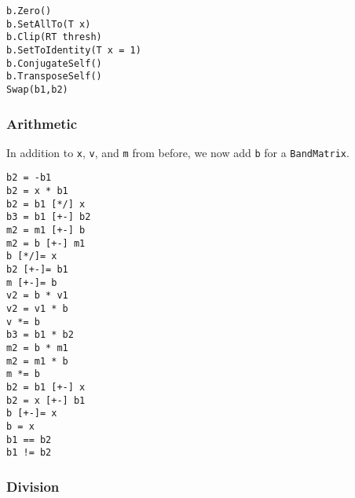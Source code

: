 \documentclass[twoside,letterpaper,11pt]{article}
\renewcommand{\tt}[1]{{\texttt {#1}}}
\begin{document}
\begin{verbatim}
b.Zero()
b.SetAllTo(T x)
b.Clip(RT thresh)
b.SetToIdentity(T x = 1)
b.ConjugateSelf()
b.TransposeSelf()
Swap(b1,b2)
\end{verbatim}

\subsubsection{Arithmetic}

In addition to \tt{x}, \tt{v}, and \tt{m} from before, we now add \tt{b} 
for a \tt{BandMatrix}.

\begin{verbatim}
b2 = -b1
b2 = x * b1
b2 = b1 [*/] x
b3 = b1 [+-] b2
m2 = m1 [+-] b
m2 = b [+-] m1
b [*/]= x
b2 [+-]= b1
m [+-]= b
v2 = b * v1
v2 = v1 * b
v *= b
b3 = b1 * b2
m2 = b * m1
m2 = m1 * b
m *= b
b2 = b1 [+-] x
b2 = x [+-] b1
b [+-]= x
b = x
b1 == b2
b1 != b2
\end{verbatim}

\subsubsection{Division}
\end{document}
